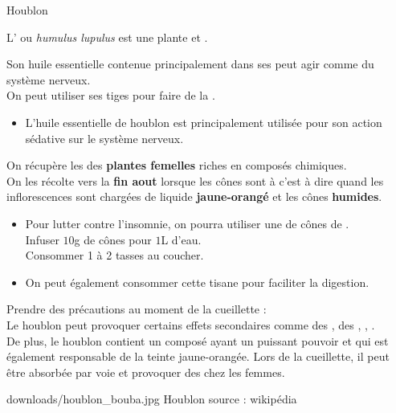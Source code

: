 \label{houblon}
\ficheidentiteplante
{Houblon}
{%
    L' ou 
    \textit{humulus lupulus} est une plante  et .

    Son huile essentielle contenue principalement dans ses  peut agir comme  du système nerveux.\\

    On peut utiliser ses tiges pour faire de la .

}
{%
    \begin{itemize}[label = \bcplume]
        \item L'huile essentielle de houblon est principalement utilisée pour son action sédative sur le système nerveux.
    \end{itemize}
}
{%
    On récupère les  des \textbf{plantes femelles} riches en composés chimiques.\\
    On les récolte vers la \textbf{fin aout} lorsque les cônes sont à 
     c'est à dire quand les inflorescences sont chargées 
    de liquide \textbf{jaune-orangé} et les cônes \textbf{humides}.
}
{%
    \begin{itemize}[label = \bcoeil]
        \item Pour lutter contre l'insomnie, on pourra utiliser une  de cônes de .\\
        Infuser $10$g de cônes pour $1$L d'eau.\\
        Consommer 1 à 2 tasses au coucher.
        \item On peut également consommer cette tisane pour faciliter la digestion.
    \end{itemize}
}
{%
    \begin{Remarque}
        Prendre des précautions au moment de la cueillette :\\
        Le houblon peut provoquer certains effets secondaires comme des , des , , .\\

        De plus, le houblon contient un composé  ayant un puissant pouvoir  
        et qui est également responsable de la teinte jaune-orangée.
        Lors de la cueillette, il peut être absorbée par voie  et provoquer des  chez les femmes.\\
    \end{Remarque}
}
{%
    downloads/houblon_bouba.jpg
}
{%
    Houblon
}
{%
    source : wikipédia
}

